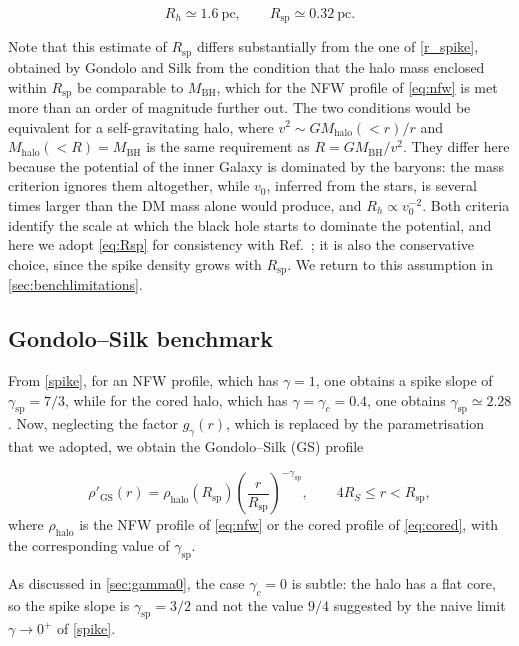 \begin{equation} \label{eq:Rsp}
R_h \simeq 1.6~\mathrm{pc}, \qquad R_{\mathrm{sp}} \simeq 0.32~\mathrm{pc}.
\end{equation}

Note that this estimate of $R_{\mathrm{sp}}$ differs substantially from the one of
\cref{r_spike}, obtained by Gondolo and Silk from the condition that the halo mass
enclosed within $R_{\mathrm{sp}}$ be comparable to $M_{\mathrm{BH}}$, which for the NFW
profile of \cref{eq:nfw} is met more than an order of magnitude further out. The two
conditions would be equivalent for a self-gravitating halo, where
$v^{2} \sim G M_{\mathrm{halo}}(<r)/r$ and $M_{\mathrm{halo}}(<R) = M_{\mathrm{BH}}$
is the same requirement as $R = G M_{\mathrm{BH}}/v^{2}$. They differ here because the
potential of the inner Galaxy is dominated by the baryons: the mass criterion ignores
them altogether, while $v_0$, inferred from the stars, is several times larger than the
DM mass alone would produce, and $R_h \propto v_0^{-2}$. Both criteria identify the
scale at which the black hole starts to dominate the potential, and here we adopt
\cref{eq:Rsp} for consistency with Ref.~\cite{balaji2023darkmatterspikessgr}; it is also
the conservative choice, since the spike density grows with $R_{\mathrm{sp}}$. We return
to this assumption in \cref{sec:benchlimitations}.


\subsection{Gondolo--Silk benchmark}

From \cref{spike}, for an NFW profile, which has $\gamma = 1$, one obtains a spike slope of $\gamma_{\mathrm{sp}} = 7/3$, while for the cored halo, which has $\gamma = \gamma_c = 0.4$, one obtains $\gamma_{\mathrm{sp}} \simeq 2.28$.
Now, neglecting the factor $g_\gamma(r)$, which is replaced by the parametrisation that we adopted, 
we obtain the Gondolo--Silk (GS) profile 

\begin{equation}
\rho'_{\mathrm{GS}}(r)
=
\rho_{\mathrm{halo}}(R_{\mathrm{sp}})
\left(\frac{r}{R_{\mathrm{sp}}}\right)^{-\gamma_{\mathrm{sp}}},
\qquad 4R_S \leq r < R_{\mathrm{sp}},
\label{eq:gs}
\end{equation}
where $\rho_{\mathrm{halo}}$ is the NFW profile of \cref{eq:nfw} or the
cored profile of \cref{eq:cored}, with the corresponding value of
$\gamma_{\mathrm{sp}}$.


As discussed in \cref{sec:gamma0}, the case $\gamma_c = 0$ is subtle: the halo has a flat core, so the spike slope is $\gamma_{\mathrm{sp}} = 3/2$ 
and not the value $9/4$ suggested by the naive limit $\gamma \to 0^{+}$ of \cref{spike}.


